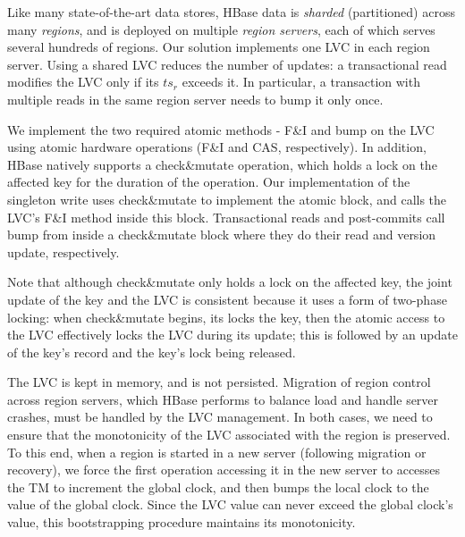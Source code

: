 Like many state-of-the-art data stores, HBase data is \emph{sharded} (partitioned) 
across many \emph{regions}, and is deployed on multiple  \emph{region servers}, each of which serves
several hundreds of regions. Our solution implements one LVC in each region server. 
Using a shared LVC reduces the number of updates:  
a transactional read modifies the LVC only if its $ts_r$ exceeds it. In particular, 
a transaction with multiple reads in the same region server needs to bump it only once. 

We implement the two required atomic methods - F\&I and bump on the LVC using atomic hardware operations (F\&I and CAS, respectively). 
In addition, 
HBase   natively supports  a check\&mutate operation, which holds a lock on the affected key for the duration of the operation.
Our implementation of the singleton write uses  check\&mutate to implement the atomic block, and calls the LVC's F\&I method inside this block.
Transactional reads and post-commits call bump from inside a check\&mutate  block where they do their read and version update, respectively. 

Note that although check\&mutate only holds a lock on the affected key, the joint update of the key and the LVC is consistent
because it uses a form of two-phase locking: when check\&mutate begins, its locks the key, then the atomic access to the LVC
effectively locks the LVC during its update; this is followed by an update of the key's record and the key's lock being released.

The LVC is kept in memory, and is not persisted. Migration of region control across region servers, which HBase performs 
to balance load and handle server crashes, must be handled by the LVC management. 
In both cases, we need to ensure that the monotonicity of the LVC associated with the %
region is preserved. To this end, when a region is started in a new server (following migration or recovery), 
we force the first operation accessing it
in the new server to accesses the TM to increment the global clock, and then 
bumps the local clock to the value of the global clock.
Since the LVC value can never exceed the global clock's value, this bootstrapping procedure maintains its monotonicity.



